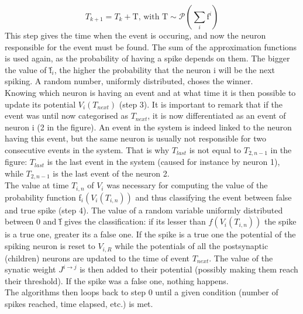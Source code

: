 \documentclass{article}
\begin{document}
		\begin{equation}
			T_{k+1}=T_k+\text{\~T}\text{, with \~T}\sim\mathscr{P}(\sum_i\text{\~f}^i)
		\end{equation}
		This step gives the time when the event is occuring, and now the neuron responsible for the event must be found. The sum of the approximation functions is used again, as the probability of having a spike depends on them. The bigger the value of \~f$_i$, the higher the probability that the neuron i will be the next spiking. A random number, uniformly distributed, choses the winner.\\\indent
		Knowing which neuron is having an event and at what time it is then possible to update its potential $V_i(T_{next})$ (step 3). It is important to remark that if the event was until now categorised as $T_{next}$, it is now differentiated as an event of neuron i (2 in the figure). An event in the system is indeed linked to the neuron having this event, but the same neuron is usually not responsible for two consecutive events in the system. That is why $T_{last}$ is not equal to $T_{2,n-1}$ in the figure: $T_{last}$ is the last event in the system (caused for instance by neuron 1), while $T_{2,n-1}$ is the last event of the neuron 2.\\\indent
		The value at time $T_{i,n}$ of $V_i$ was necessary for computing the value of the probability function f$_i(V_i(T_{i,n}))$ and thus classifying the event between false and true spike (step 4). The value of a random variable uniformly distributed between 0 and \~f gives the classification: if its lesser than $f(V_i(T_{i,n}))$ the spike is a true one, greater its a false one. If the spike is a true one the potential of the spiking neuron is reset to $V_{i,R}$ while the potentials of all the postsynaptic (children) neurons are updated to the time of event $T_{next}$. The value of the synatic weight $J^{i\rightarrow j}$ is then added to their potential (possibly making them reach their threshold). If the spike was a false one, nothing happens.\\\indent
		The algorithms then loops back to step 0 until a given condition (number of spikes reached, time elapsed, etc.) is met.\\\indent
\end{document}
